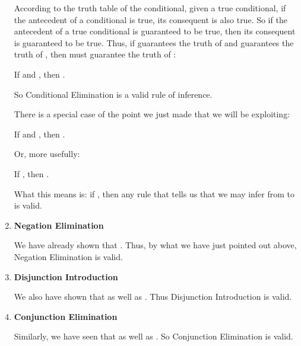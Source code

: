 \begin{enumerate}
 According to the truth table of the conditional, given a true conditional, if 
 the antecedent of a conditional is true, its consequent is also true. So if the 
 antecedent of a true conditional is guaranteed to be true, then its consequent 
 is guaranteed to be true. Thus, if \p{\Gamma} guarantees the truth of 
  and \p{\Delta} guarantees the truth of , then 
 \p{\Gamma,\Delta} must guarantee the truth of : 

 \begin{center}
  If  and , then 
  .  \end{center}

 So Conditional Elimination is a valid rule of inference.

There is a special case of the point we just made that we will be exploiting:

\begin{center}
If  and , then 
. 

\end{center}
Or, more usefully: 

\begin{center}
 If , then . 

\end{center}

What this means is: if , then any rule that tells 
us that we may infer from  to  is 
valid.


\item \textbf{Negation Elimination}

We have already shown that . Thus, by what 
we have just pointed out above, Negation Elimination is valid.

\item \textbf{Disjunction Introduction}

We also have shown that  as well as 
. Thus Disjunction Introduction is valid.

\item \textbf{Conjunction Elimination}

Similarly, we have seen that  as well 
as . So Conjunction Elimination is 
valid.



\end{enumerate}
